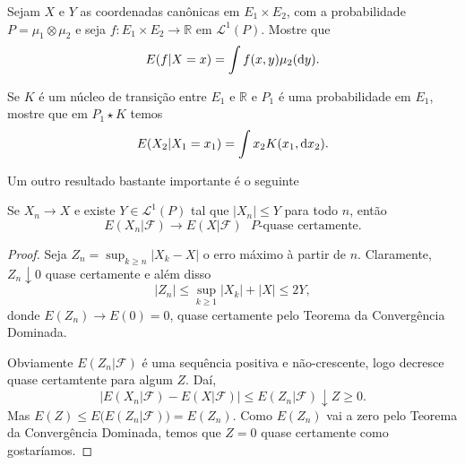 \documentclass[../Notas_de_aula.tex]{subfiles}
\begin{document}
\begin{exercise}
  Sejam $X$ e $Y$ as coordenadas canônicas em $E_1 \times E_2$, com a probabilidade $P = \mu_1 \otimes \mu_2$ e seja $f:E_1 \times E_2 \to \mathbb{R}$ em $\mathcal{L}^1(P)$.
  Mostre que
  \begin{equation}
     E(f|X = x) = \int f(x, y) \mu_2(\mathop{}\!\mathrm{d} y).
  \end{equation}
\end{exercise}

\begin{exercise}
  Se $K$ é um núcleo de transição entre $E_1$ e $\mathbb{R}$ e $P_1$ é uma probabilidade em $E_1$, mostre que em $P_1 \star K$ temos
  \begin{equation}
    E(X_2|X_1 = x_1) = \int x_2 K(x_1, \mathop{}\!\mathrm{d} x_2).
  \end{equation}
\end{exercise}

Um outro resultado bastante importante é o seguinte

\begin{theorem}
  Se $X_n \to X$ e existe $Y \in \mathcal{L}^1(P)$ tal que $|X_n| \leq Y$ para todo $n$, então
  \begin{equation}
    E(X_n | \mathcal{F}) \to E(X|\mathcal{F}) \text{ $P$-quase certamente.}
  \end{equation}
\end{theorem}

\begin{proof}
  Seja $Z_n = \sup_{k \geq n} |X_k - X|$ o erro máximo à partir de $n$.
  Claramente, $Z_n \downarrow 0$ quase certamente e além disso
  \begin{equation}
    |Z_n| \leq \sup_{k \geq 1} |X_k| + |X| \leq 2 Y,
  \end{equation}
  donde $E(Z_n) \to E(0) = 0$, quase certamente pelo Teorema da Convergência Dominada.

  Obviamente $E(Z_n|\mathcal{F})$ é uma sequência positiva e não-crescente, logo decresce quase certamtente para algum $Z$.
  Daí,
  \begin{equation}
    \big| E(X_n | \mathcal{F}) - E(X | \mathcal{F}) \big| \leq E(Z_n | \mathcal{F}) \downarrow Z \geq 0.
  \end{equation}
  Mas $E(Z) \leq E\big( E(Z_n|\mathcal{F}) \big) = E(Z_n)$.
  Como $E(Z_n)$ vai a zero pelo Teorema da Convergência Dominada, temos que $Z = 0$ quase certamente como gostaríamos.
\end{proof}
\end{document}
